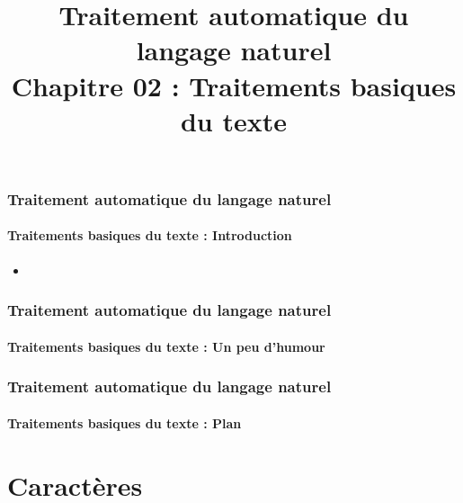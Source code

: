 \documentclass[xcolor=table]{beamer}
\title[TALN : 02- Traitements basiques]%
{Traitement automatique du langage naturel\\Chapitre 02 : Traitements basiques du texte}
\begin{document}
	
\begin{frame}
\frametitle{Traitement automatique du langage naturel}
\framesubtitle{Traitements basiques du texte : Introduction}

\begin{itemize}
	\item 
\end{itemize}
\end{frame}

\begin{frame}
\frametitle{Traitement automatique du langage naturel}
\framesubtitle{Traitements basiques du texte : Un peu d'humour}


\end{frame}

\begin{frame}
\frametitle{Traitement automatique du langage naturel}
\framesubtitle{Traitements basiques du texte : Plan}

\begin{multicols}{2}
\tableofcontents
\end{multicols}
\end{frame}

\section{Caractères}
\end{document}
